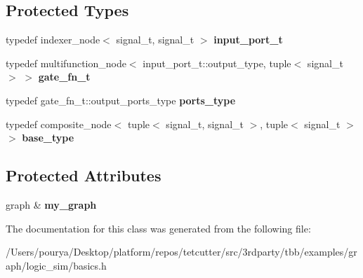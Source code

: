 \subsection*{Protected Types}
\begin{DoxyCompactItemize}
\item 
\hypertarget{classgate_3_012_01_4_abe0b77de8af449a97717e6fd44ec5ae5}{}typedef indexer\+\_\+node$<$ signal\+\_\+t, signal\+\_\+t $>$ {\bfseries input\+\_\+port\+\_\+t}\label{classgate_3_012_01_4_abe0b77de8af449a97717e6fd44ec5ae5}

\item 
\hypertarget{classgate_3_012_01_4_ae3610ea8851c16bae9792e9cdaf36dc3}{}typedef multifunction\+\_\+node$<$ input\+\_\+port\+\_\+t\+::output\+\_\+type, tuple$<$ signal\+\_\+t $>$ $>$ {\bfseries gate\+\_\+fn\+\_\+t}\label{classgate_3_012_01_4_ae3610ea8851c16bae9792e9cdaf36dc3}

\item 
\hypertarget{classgate_3_012_01_4_a36f74a9def8e3c02fa24bf0d50315be5}{}typedef gate\+\_\+fn\+\_\+t\+::output\+\_\+ports\+\_\+type {\bfseries ports\+\_\+type}\label{classgate_3_012_01_4_a36f74a9def8e3c02fa24bf0d50315be5}

\item 
\hypertarget{classgate_3_012_01_4_aaad471eead91385a0edee2abc1ff2854}{}typedef composite\+\_\+node$<$ tuple$<$ signal\+\_\+t, signal\+\_\+t $>$, tuple$<$ signal\+\_\+t $>$ $>$ {\bfseries base\+\_\+type}\label{classgate_3_012_01_4_aaad471eead91385a0edee2abc1ff2854}

\end{DoxyCompactItemize}
\subsection*{Protected Attributes}
\begin{DoxyCompactItemize}
\item 
\hypertarget{classgate_3_012_01_4_ab632a5cc6b25d683c599d31a82212f65}{}graph \& {\bfseries my\+\_\+graph}\label{classgate_3_012_01_4_ab632a5cc6b25d683c599d31a82212f65}

\end{DoxyCompactItemize}


The documentation for this class was generated from the following file\+:\begin{DoxyCompactItemize}
\item 
/\+Users/pourya/\+Desktop/platform/repos/tetcutter/src/3rdparty/tbb/examples/graph/logic\+\_\+sim/basics.\+h\end{DoxyCompactItemize}

